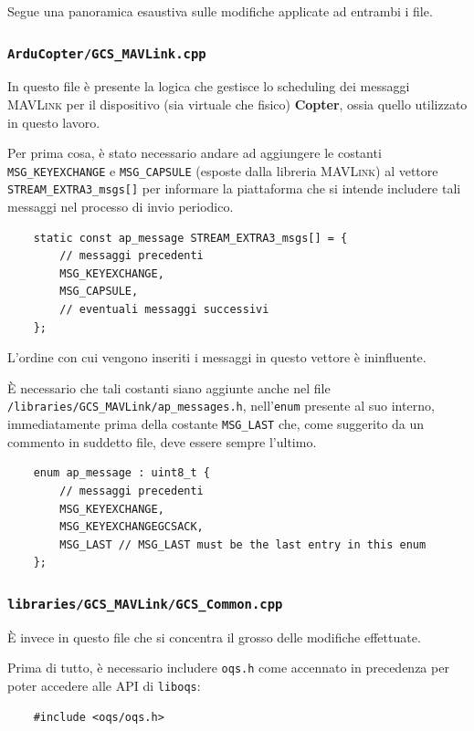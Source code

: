 \documentclass[a4paper, 12pt, oneside]{article}
\theoremstyle{definition}
\begin{document}
Segue una panoramica esaustiva sulle modifiche applicate ad entrambi i file.

\subsubsection{\texttt{ArduCopter/GCS\_MAVLink.cpp}}
In questo file è presente la logica che gestisce lo scheduling dei messaggi \textsc{MAVLink} per il dispositivo (sia virtuale che fisico) \textbf{Copter}, ossia quello utilizzato in questo lavoro.

Per prima cosa, è stato necessario andare ad aggiungere le costanti \texttt{MSG\_KEYEXCHANGE} e \texttt{MSG\_CAPSULE} (esposte dalla libreria \textsc{MAVLink}) al vettore \texttt{STREAM\_EXTRA3\_msgs[]} per informare la piattaforma che si intende includere tali messaggi nel processo di invio periodico.

\begin{verbatim}
    static const ap_message STREAM_EXTRA3_msgs[] = {
        // messaggi precedenti
        MSG_KEYEXCHANGE,
        MSG_CAPSULE,
        // eventuali messaggi successivi
    };
\end{verbatim}

L'ordine con cui vengono inseriti i messaggi in questo vettore è ininfluente.

È necessario che tali costanti siano aggiunte anche nel file \texttt{/libraries/GCS\_MAVLink/ap\_messages.h}, nell'\texttt{enum} presente al suo interno, immediatamente prima della costante \texttt{MSG\_LAST} che, come suggerito da un commento in suddetto file, deve essere sempre l'ultimo.

\begin{verbatim}
    enum ap_message : uint8_t {
        // messaggi precedenti
        MSG_KEYEXCHANGE,
        MSG_KEYEXCHANGEGCSACK,
        MSG_LAST // MSG_LAST must be the last entry in this enum
    };
\end{verbatim}

\subsubsection{\texttt{libraries/GCS\_MAVLink/GCS\_Common.cpp}}
È invece in questo file che si concentra il grosso delle modifiche effettuate.

Prima di tutto, è necessario includere \texttt{oqs.h} come accennato in precedenza per poter accedere alle API di \texttt{liboqs}:

\begin{verbatim}
    #include <oqs/oqs.h>
\end{verbatim}
\end{document}
